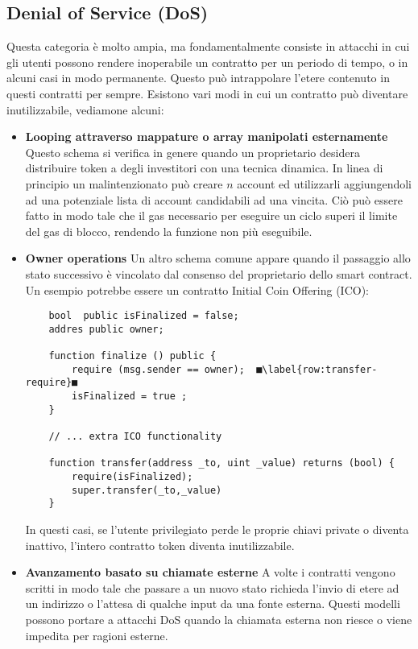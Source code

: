 \subsection*{Denial of Service (DoS)}
Questa categoria è molto ampia, ma fondamentalmente consiste in attacchi in cui gli utenti possono rendere inoperabile un contratto per un periodo di tempo, o in alcuni casi in modo permanente. Questo può intrappolare l'etere contenuto in questi contratti per sempre. Esistono vari modi in cui un contratto può diventare inutilizzabile, vediamone alcuni:
\begin{itemize}
	\item \textbf{Looping attraverso mappature o array manipolati esternamente} Questo schema si verifica in genere quando un proprietario desidera distribuire token a degli investitori con una tecnica dinamica. In linea di principio un malintenzionato può creare $n$ account ed utilizzarli aggiungendoli ad una potenziale lista di account candidabili ad una vincita. Ciò può essere fatto in modo tale che il gas necessario per eseguire un ciclo superi il limite del gas di blocco, rendendo la funzione non più eseguibile.
	\item \textbf{Owner operations} Un altro schema comune appare quando il passaggio allo stato successivo è vincolato dal consenso del proprietario dello smart contract. Un esempio potrebbe essere un contratto Initial Coin Offering (ICO):
	\begin{lstlisting}
	bool  public isFinalized = false;
	addres public owner;
	
	function finalize () public {
		require (msg.sender == owner);	■\label{row:transfer-require}■
		isFinalized = true ;
	}
	
	// ... extra ICO functionality
	
	function transfer(address _to, uint _value) returns (bool) {
		require(isFinalized);
		super.transfer(_to,_value)
	} 
	\end{lstlisting}
	In questi casi, se l'utente privilegiato perde le proprie chiavi private o diventa inattivo, l'intero contratto token diventa inutilizzabile.
	
	\item \textbf{Avanzamento basato su chiamate esterne} A volte i contratti vengono scritti in modo tale che passare a un nuovo stato richieda l'invio di etere ad un indirizzo o l'attesa di qualche input da una fonte esterna. Questi modelli possono portare a attacchi DoS quando la chiamata esterna non riesce o viene impedita per ragioni esterne.
\end{itemize}
